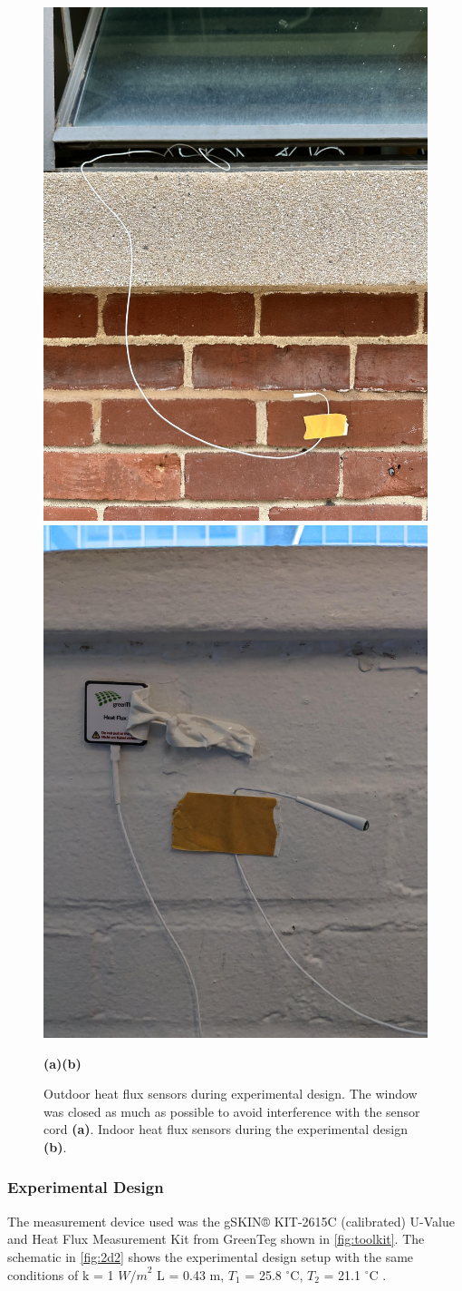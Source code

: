 \begin{figure}[htb]
    \centering
    \includegraphics[width=0.495\linewidth]{Figures/expfig1.jpg}
    \includegraphics[width=0.495\linewidth]{Figures/expfig2.jpg}

    \hspace{3.5cm}\textbf{(a)}\hfill\textbf{(b)}\hspace{3.7cm}

     \caption[Experimental heat flux measurement setup]{Outdoor heat flux sensors during experimental design. The window was closed as much as possible to avoid interference with the sensor cord \textbf{(a)}. Indoor heat flux sensors during the experimental design \textbf{(b)}.}
   \label{fig:figexp1}
 \end{figure}




 
\subsubsection{Experimental Design}
 The  measurement device used was the gSKIN® KIT-2615C (calibrated) U-Value and Heat Flux Measurement Kit from GreenTeg \cite{greenteg} shown in \ref{fig:toolkit}. 
 The schematic in \cref{fig:2d2} shows the experimental design setup with the same conditions of k  = 1 ${W/m}^2$ 
L  = 0.43 m,
$T_1$ = 25.8 $^\circ \text{C}$, 
$T_2$  = 21.1  $^\circ \text{C}$ .

